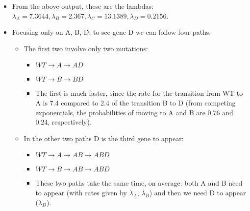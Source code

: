 \documentclass[11pt]{article}
\begin{document}
\begin{enumerate}
\begin{itemize}
\item From the above output, these are the lambdas: $\lambda_A = 7.3644, \lambda_B = 2.367, \lambda_C = 13.1389, \lambda_D = 0.2156$.
\item Focusing only on A, B, D, to see gene D we can follow four paths.
\begin{itemize}
\item The first two involve only two mutations:
\begin{itemize}
\item \(WT \rightarrow A \rightarrow AD\)
\item \(WT \rightarrow B \rightarrow BD\)
\item The first is much faster, since the rate for the transition from WT to A is 7.4 compared to 2.4 of the transition B to D (from competing exponentials, the probabilities of moving to A and B are 0.76 and 0.24, respectively).
\end{itemize}
\item In the other two paths D is the third gene to appear:
\begin{itemize}
\item \(WT \rightarrow A \rightarrow AB \rightarrow ABD\)
\item \(WT \rightarrow B \rightarrow AB \rightarrow ABD\)
\item These two paths take the same time, on average: both A and B need to appear (with rates given by \(\lambda_A\), \(\lambda_B\)) and then we need D to appear (\(\lambda_D\)).
\end{itemize}


\end{itemize}
\end{itemize}
\end{enumerate}
\end{document}
